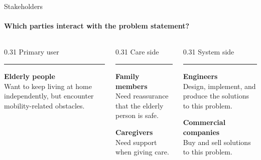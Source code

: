 \begin{frame}{Stakeholders}
\framesubtitle{Which parties interact with the problem statement?}

\vspace{0.3cm}

\begin{columns}[T,onlytextwidth]

\begin{column}{0.31\textwidth}
{\color{tud Turquoise}\Large Primary user}

\vspace{0.12cm}
{\color{tud Turquoise}\rule{\linewidth}{2pt}}

\vspace{0.35cm}
\small
\textbf{Elderly people}\\
Want to keep living at home independently, but encounter mobility-related obstacles.
\end{column}

\hfill

\begin{column}{0.31\textwidth}
{\color{tud Turquoise}\Large Care side}

\vspace{0.12cm}
{\color{tud Turquoise}\rule{\linewidth}{2pt}}

\vspace{0.35cm}
\small
\textbf{Family members}\\
Need reassurance that the elderly person is safe.

\vspace{0.35cm}
\textbf{Caregivers}\\
Need support when giving care.
\end{column}

\hfill

\begin{column}{0.31\textwidth}
{\color{tud Turquoise}\Large System side}

\vspace{0.12cm}
{\color{tud Turquoise}\rule{\linewidth}{2pt}}

\vspace{0.35cm}
\small
\textbf{Engineers}\\
Design, implement, and produce the solutions to this problem.

\vspace{0.35cm}
\textbf{Commercial companies}\\
Buy and sell solutions to this problem.
\end{column}

\end{columns}

\end{frame}